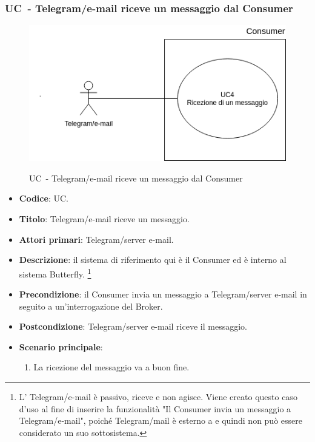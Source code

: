 \subsubsection{UC\theuccount\ - Telegram/e-mail riceve un messaggio dal Consumer}
	\begin{figure}[H]
		\centering
			\includegraphics[width=0.7\columnwidth]{img/UC4.png}\\
		\caption{UC\theuccount\ - Telegram/e-mail riceve un messaggio dal Consumer}
	\end{figure}
	\begin{itemize}
		\item \textbf{Codice}: UC\theuccount.
		\item \textbf{Titolo}: Telegram/e-mail riceve un messaggio.
		\item \textbf{Attori primari}: Telegram/server e-mail.
		\item \textbf{Descrizione}: il sistema di riferimento qui è il Consumer ed è interno al sistema Butterfly.
		\footnote{L' Telegram/e-mail è passivo, riceve e non agisce. Viene creato questo caso d'uso al fine di inserire la funzionalità "Il Consumer invia un messaggio a Telegram/e-mail", poiché Telegram/mail è esterno a \progetto e quindi non può essere considerato un suo sottosistema.}
		
		\item \textbf{Precondizione}: il Consumer invia un messaggio a Telegram/server e-mail in seguito a un'interrogazione del Broker.
		\item \textbf{Postcondizione}: Telegram/server e-mail riceve il messaggio.
		\item \textbf{Scenario principale}:
		\begin{enumerate}
			\item La ricezione del messaggio va a buon fine.
		\end{enumerate} 
	\end{itemize}



